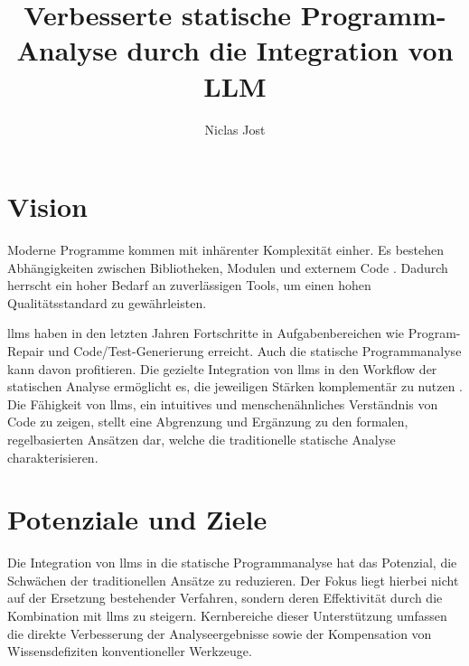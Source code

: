 \documentclass[%
    paper=A4,               %
    ngerman,
    parskip=half,           %
    11pt,                   %
    headings=normal,        %
    bibliography=totoc,     %
    listof=totoc,           %
    chapterprefix=false,    %
    appendixprefix=false,    %
    draft=false,            %
]{scrartcl}%
\title{Verbesserte statische Programm-Analyse durch die Integration von LLM}
\author{Niclas Jost}
\date{}
\begin{document}
\maketitle
\thispagestyle{scrheadings}
\section{Vision} 


Moderne Programme kommen mit inhärenter Komplexität einher. Es bestehen Abhängigkeiten zwischen Bibliotheken, Modulen und externem Code \cite{khareUnderstandingEffectivenessLarge2024}. Dadurch herrscht ein hoher Bedarf an zuverlässigen Tools, um einen hohen Qualitätsstandard zu gewährleisten.

\acp{llm} haben in den letzten Jahren Fortschritte in Aufgabenbereichen wie Program-Repair \cite{xiaAutomatedProgramRepair2023} und Code/Test-Generierung \cite{lemieuxCodaMosaEscapingCoverage2023} erreicht. Auch die statische Programmanalyse kann davon profitieren. Die gezielte Integration von \acp{llm} in den Workflow der statischen Analyse ermöglicht es, die jeweiligen Stärken komplementär zu nutzen \cite{liEnhancingStaticAnalysis2024}\cite{wagnerEffectiveComplementarySecurity2025}.
Die Fähigkeit von \acp{llm}, ein intuitives und menschenähnliches Verständnis von Code zu zeigen, stellt eine Abgrenzung und Ergänzung zu den formalen, regelbasierten Ansätzen dar, welche die traditionelle statische Analyse charakterisieren\cite{liEnhancingStaticAnalysis2024}.



\selectlanguage{\ngerman}


\section{Potenziale und Ziele}\label{sec:potent}

Die Integration von \acp{llm} in die statische Programmanalyse hat das Potenzial, die Schwächen der traditionellen Ansätze zu reduzieren. Der Fokus liegt hierbei nicht auf der Ersetzung bestehender Verfahren, sondern deren Effektivität durch die Kombination mit \acp{llm} zu steigern\cite{khareUnderstandingEffectivenessLarge2024}. Kernbereiche dieser Unterstützung umfassen die direkte Verbesserung der Analyseergebnisse sowie der Kompensation von Wissensdefiziten konventioneller Werkzeuge.
\end{document}
